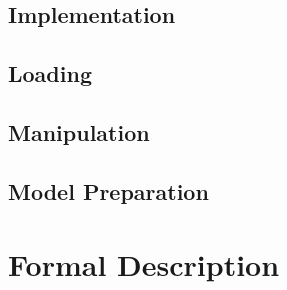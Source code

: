         \subsection{Implementation}
        
        \subsection{Loading}
        
        \subsection{Manipulation}
        
        \subsection{Model Preparation}
        
    \section{Formal Description}
    

